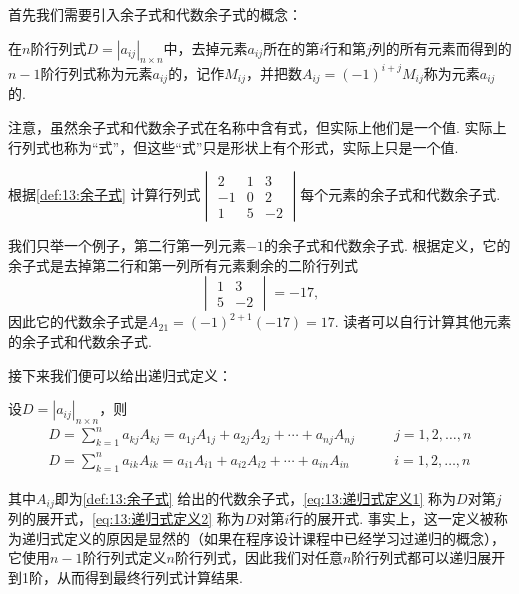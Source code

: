 首先我们需要引入余子式和代数余子式的概念：
\begin{definition} \label{def:13:余子式}
    在$n$阶行列式$D=|a_{ij}|_{n \times n}$中，去掉元素$a_{ij}$所在的第$i$行和第$j$列的所有元素而得到的$n-1$阶行列式称为元素$a_{ij}$的，记作$M_{ij}$，并把数$A_{ij}=(-1)^{i+j}M_{ij}$称为元素$a_{ij}$的.
\end{definition}
注意，虽然余子式和代数余子式在名称中含有式，但实际上他们是一个值. 实际上行列式也称为``式''，但这些``式''只是形状上有个形式，实际上只是一个值.
\begin{example} \label{ex:13:余子式}
    根据\autoref{def:13:余子式} 计算行列式$\begin{vmatrix}
            2  & 1 & 3  \\
            -1 & 0 & 2  \\
            1  & 5 & -2
        \end{vmatrix}$每个元素的余子式和代数余子式.
\end{example}

\begin{solution}
    我们只举一个例子，第二行第一列元素$-1$的余子式和代数余子式. 根据定义，它的余子式是去掉第二行和第一列所有元素剩余的二阶行列式
    \[\begin{vmatrix}
            1 & 3 \\
            5 & -2
        \end{vmatrix}=-17,\]
    因此它的代数余子式是$A_{21}=(-1)^{2+1}(-17)=17$. 读者可以自行计算其他元素的余子式和代数余子式.
\end{solution}

接下来我们便可以给出递归式定义：
\begin{definition} \label{def:13:递归式定义}
    设$D=|a_{ij}|_{n \times n}$，则
    \begin{align}
        \label{eq:13:递归式定义1}
        D=\sum_{k=1}^{n}a_{kj}A_{kj}=a_{1j}A_{1j}+a_{2j}A_{2j}+\cdots+a_{nj}A_{nj} & \qquad j=1,2,\ldots,n \\
        \label{eq:13:递归式定义2}
        D=\sum_{k=1}^{n}a_{ik}A_{ik}=a_{i1}A_{i1}+a_{i2}A_{i2}+\cdots+a_{in}A_{in} & \qquad i=1,2,\ldots,n
    \end{align}
\end{definition}
其中$A_{ij}$即为\autoref{def:13:余子式} 给出的代数余子式，\autoref{eq:13:递归式定义1} 称为$D$对第$j$列的展开式，\autoref{eq:13:递归式定义2} 称为$D$对第$i$行的展开式. 事实上，这一定义被称为递归式定义的原因是显然的（如果在程序设计课程中已经学习过递归的概念），它使用$n-1$阶行列式定义$n$阶行列式，因此我们对任意$n$阶行列式都可以递归展开到1阶，从而得到最终行列式计算结果.

